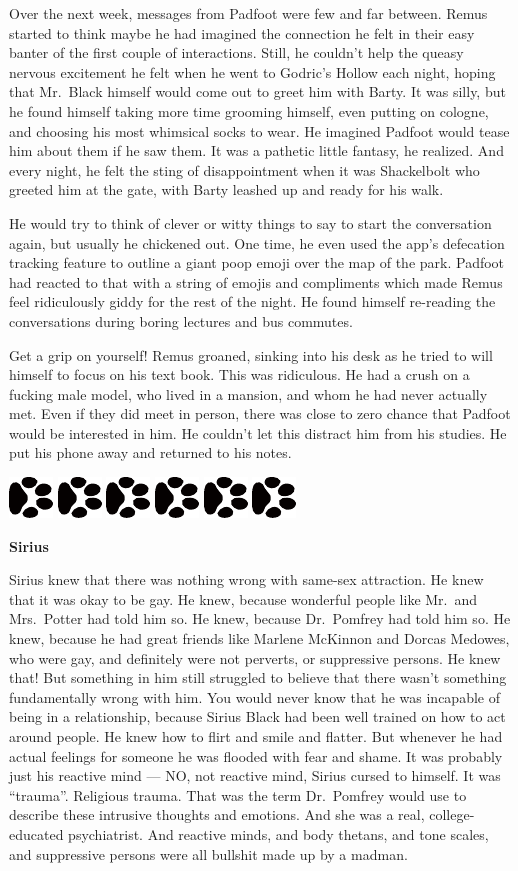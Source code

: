 \documentclass[12pt,twoside,openright]{memoir}
\newcommand{\dogPrintRule}{	
	\begin{center}
		\hspace{.5em}
		\includegraphics[angle=60]{dogprint.pdf}
		\hspace{.5em}
		\includegraphics[angle=120]{dogprint.pdf}
		\hspace{.5em}
		\includegraphics[angle=60]{dogprint.pdf}
		\hspace{.5em}
		\includegraphics[angle=120]{dogprint.pdf}
		\hspace{.5em}
		\includegraphics[angle=60]{dogprint.pdf}
		\hspace{.5em}
		\includegraphics[angle=120]{dogprint.pdf}
		\hspace{.5em}
	\end{center}
}
\begin{document}
Over the next week, messages from Padfoot were few and far between. Remus started to think maybe he had imagined the connection he felt in their easy banter of the first couple of interactions. Still, he couldn't help the queasy nervous excitement he felt when he went to Godric's Hollow each night, hoping that Mr.\ Black himself would come out to greet him with Barty. It was silly, but he found himself taking more time grooming himself, even putting on cologne, and choosing his most whimsical socks to wear. He imagined Padfoot would tease him about them if he saw them. It was a pathetic little fantasy, he realized. And every night, he felt the sting of disappointment when it was Shackelbolt who greeted him at the gate, with Barty leashed up and ready for his walk.
 
He would try to think of clever or witty things to say to start the conversation again, but usually he chickened out. One time, he even used the app's defecation tracking feature to outline a giant poop emoji over the map of the park. Padfoot had reacted to that with a string of emojis and compliments which made Remus feel ridiculously giddy for the rest of the night. He found himself re-reading the conversations during boring lectures and bus commutes.

Get a grip on yourself! Remus groaned, sinking into his desk as he tried to will himself to focus on his text book. This was ridiculous. He had a crush on a fucking male model, who lived in a mansion, and whom he had never actually met. Even if they did meet in person, there was close to zero chance that Padfoot would be interested in him. He couldn't let this distract him from his studies. He put his phone away and returned to his notes.

\dogPrintRule

\textbf{Sirius} 

Sirius knew that there was nothing wrong with same-sex attraction. He knew that it was okay to be gay. He knew, because wonderful people like Mr.\ and Mrs.\ Potter had told him so. He knew, because Dr.\ Pomfrey had told him so. He knew, because he had great friends like Marlene McKinnon and Dorcas Medowes, who were gay, and definitely were not perverts, or suppressive persons. He knew that! But something in him still struggled to believe that there wasn't something fundamentally wrong with him. You would never know that he was incapable of being in a relationship, because Sirius Black had been well trained on how to act around people. He knew how to flirt and smile and flatter. But whenever he had actual feelings for someone he was flooded with fear and shame. It was probably just his reactive mind --- NO, not reactive mind, Sirius cursed to himself. It was ``trauma''. Religious trauma. That was the term Dr.\ Pomfrey would use to describe these intrusive thoughts and emotions. And she was a real, college-educated psychiatrist. And reactive minds, and body thetans, and tone scales, and suppressive persons were all bullshit made up by a madman.
\end{document}
